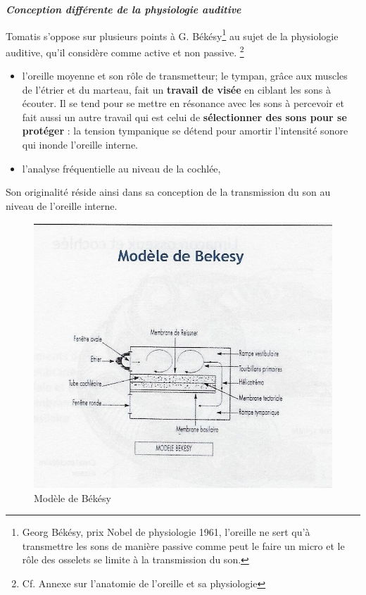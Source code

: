 \emph{\textbf{Conception différente de la physiologie auditive}}

Tomatis  s'oppose sur plusieurs points à G. Békésy\footnote{Georg Békésy, prix 
Nobel de physiologie 1961, l'oreille ne sert qu'à transmettre les sons de manière passive
comme peut le faire un micro et le rôle des osselets 
se limite à la transmission du
son. }  au sujet de la
physiologie auditive, qu'il considère comme active et non passive. \footnote{Cf. Annexe sur l'anatomie de l'oreille et sa physiologie}


\begin{itemize}
	\item l'oreille moyenne et son rôle de transmetteur; le tympan, grâce aux muscles de l'étrier et du marteau, 
fait
		un\textbf{ travail de visée} en ciblant les sons à
                écouter. Il 
se tend
		pour se mettre en résonance avec les sons à percevoir
                et fait aussi un autre travail qui est celui de \textbf{sélectionner des 
sons
		pour se protéger} : la tension tympanique se détend pour amortir 
l'intensité
		sonore qui inonde l'oreille interne. 

	\item l'analyse fréquentielle au niveau de la cochlée, 
\end{itemize}

Son originalité réside ainsi dans sa conception de la transmission du son
au niveau de l'oreille interne. 








\begin{figure}
	\centering
	\includegraphics[width=0.7\linewidth]{images/Cochleederoule_bas.jpg}
	\caption[Modèle de Békésy]{Modèle de Békésy}
	\label{fig:cochleederoulebas}
\end{figure}


